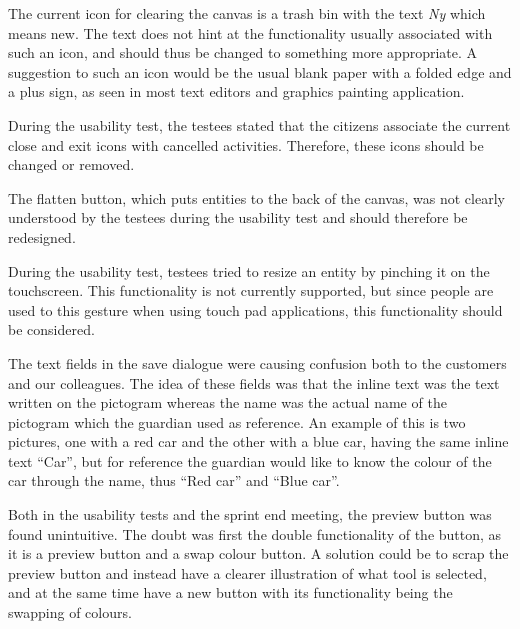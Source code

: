 \begin{description}[style=nextline]
\item[New icon for clearing the canvas]
The current icon for clearing the canvas is a trash bin with the text \textit{Ny} which means new. 
The text does not hint at the functionality usually associated with such an icon, and should thus be changed to something more appropriate.
A suggestion to such an icon would be the usual blank paper with a folded edge and a plus sign, as seen in most text editors and graphics painting application. 

\item[Close and exit icons]
During the usability test, the testees stated that the citizens associate the current close and exit icons with cancelled activities.
Therefore, these icons should be changed or removed.

\item[Flatten button icon]
The flatten button, which puts entities to the back of the canvas, was not clearly understood by the testees during the usability test and should therefore be redesigned.

\item[Pinching]
During the usability test, testees tried to resize an entity by pinching it on the touchscreen. 
This functionality is not currently supported, but since people are used to this gesture when using touch pad applications, this functionality should be considered.

\item[Names in save dialogue]
The text fields in the save dialogue were causing confusion both to the customers and our colleagues.
The idea of these fields was that the inline text was the text written on the pictogram whereas the name was the actual name of the pictogram which the guardian used as reference.
An example of this is two pictures, one with a red car and the other with a blue car, having the same inline text ``Car'', but for reference the guardian would like to know the colour of the car through the name, thus ``Red car'' and ``Blue car''.

\item[Rethink preview button]
Both in the usability tests and the sprint end meeting, the preview button was found unintuitive.
The doubt was first the double functionality of the button, as it is a preview button and a swap colour button.
A solution could be to scrap the preview button and instead have a clearer illustration of what tool is selected, and at the same time have a new button with its functionality being the swapping of colours.


\end{description}
